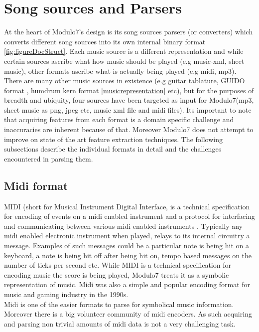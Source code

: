 \section{Song sources and Parsers} \label{m7songsources}
\noindent At the heart of Modulo7's design is its song sources parsers (or converters) which converts different song sources into its own internal binary format \ref{fig:figureDocStruct}. Each music source is a different representation and while certain sources ascribe what how music should be played (e.g music-xml, sheet music), other formats ascribe what is actually being played (e.g midi, mp3). There are many other music sources in existence (e.g guitar tablature, GUIDO format , humdrum kern format \ref{musicrepresentation} etc), but for the purposes of breadth and ubiquity, four sources have been targeted as input for Modulo7(mp3, sheet music as png, jpeg etc, music xml file and midi files). Its important to note that acquiring features from each format is a domain specific challenge and inaccuracies are inherent because of that. Moreover Modulo7 does not attempt to improve on state of the art feature extraction techniques. The following subsections describe the individual formats in detail and the challenges encountered in parsing them.

\subsection{Midi format}
\noindent MIDI (short for Musical Instrument Digital Interface, is a technical specification for encoding of events on a midi enabled instrument and a protocol for interfacing and communicating between various midi enabled instruments \cite{midispec}. Typically any midi enabled electronic instrument when played, relays to its internal circuitry a message. Examples of such messages could be a particular note is being hit on a keyboard, a note is being hit off after being hit on, tempo based messages on the number of ticks per second etc. While MIDI is a technical specification for encoding music the score is being played, Modulo7 treats it as a symbolic representation of music. Midi was also a simple and popular encoding format for music and gaming industry in the  1990s. \\

\noindent Midi is one of the easier formats to parse for symbolical music information. Moreover there is a big volunteer community of midi encoders. As such acquiring and parsing non trivial amounts of midi data is not a very challenging task. 

